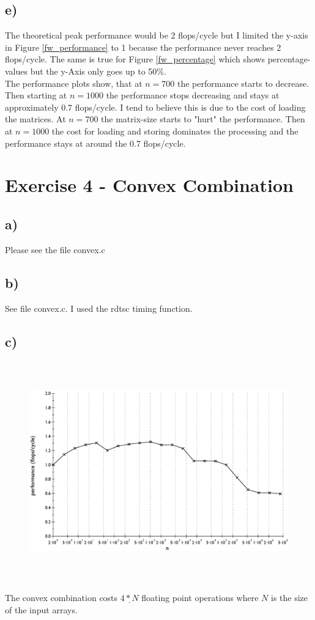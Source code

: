 \documentclass[10pt,a4paper,oneside,notitlepage]{report}
\begin{document}
\subsection*{e)}
The theoretical peak performance would be 2 flops/cycle but I limited the y-axis in Figure \ref{fw_performance} to 1 because the performance never reaches 2 flops/cycle. The same is true for Figure \ref{fw_percentage} which shows percentage-values but the y-Axis only goes up to 50\%. \\ 
The performance plots show, that at $n=700$ the performance starts to decrease. Then starting at $n=1000$ the performance stops decreasing and stays at approximately 0.7 flops/cycle. I tend to believe this is due to the cost of loading the matrices. At $n=700$ the matrix-size starts to "hurt" the performance. Then at $n=1000$ the cost for loading and storing dominates the processing and the performance stays at around the 0.7 flops/cycle.
\section*{Exercise 4 - Convex Combination}
\subsection*{a)}
Please see the file convex.c
\subsection*{b)}
See file convex.c. I used the rdtsc timing function.
\subsection*{c)}
\begin{figure}[H]
\caption{}
\includegraphics[height=9.5cm]{convex_performance}
\end{figure}
The convex combination costs $\underline{4*N}$ floating point operations where $N$ is the size of the input arrays.
\end{document}
